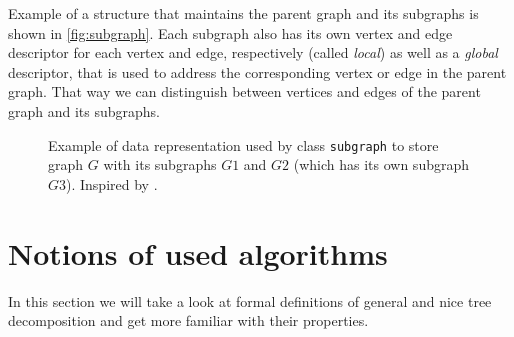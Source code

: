 \documentclass[thesis=B,english]{FITthesis}[2019/03/21]
\begin{document}
Example of a structure that maintains the parent graph and its subgraphs is shown in \autoref{fig:subgraph}. Each subgraph also has its own vertex and edge descriptor for each vertex and edge, respectively (called \emph{local}) as well as a \emph{global} descriptor, that is used to address the corresponding vertex or edge in the parent graph. That way we can distinguish between vertices and edges of the parent graph and its subgraphs.

\begin{figure}[H]
	\centering
	\hspace{2em}
	\caption[Example of data representation used by class \texttt{subgraph}]{Example of data representation used by class \texttt{subgraph} to store graph $G$ with its subgraphs $G1$ and $G2$ (which has its own subgraph $G3$). Inspired by \cite{boost_subgraph_image}.}
	\label{fig:subgraph}
\end{figure}

\section{Notions of used algorithms}
In this section we will take a look at formal definitions of general and nice tree decomposition and get more familiar with their properties.
\end{document}
